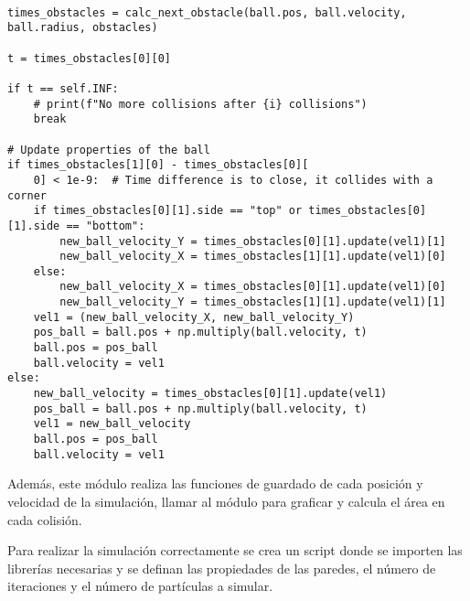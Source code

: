 \begin{lstlisting}[breaklines]

times_obstacles = calc_next_obstacle(ball.pos, ball.velocity, ball.radius, obstacles)

t = times_obstacles[0][0]

if t == self.INF:
    # print(f"No more collisions after {i} collisions")
    break

# Update properties of the ball
if times_obstacles[1][0] - times_obstacles[0][
    0] < 1e-9:  # Time difference is to close, it collides with a corner
    if times_obstacles[0][1].side == "top" or times_obstacles[0][1].side == "bottom":
        new_ball_velocity_Y = times_obstacles[0][1].update(vel1)[1]
        new_ball_velocity_X = times_obstacles[1][1].update(vel1)[0]
    else:
        new_ball_velocity_X = times_obstacles[0][1].update(vel1)[0]
        new_ball_velocity_Y = times_obstacles[1][1].update(vel1)[1]
    vel1 = (new_ball_velocity_X, new_ball_velocity_Y)
    pos_ball = ball.pos + np.multiply(ball.velocity, t)
    ball.pos = pos_ball
    ball.velocity = vel1
else:
    new_ball_velocity = times_obstacles[0][1].update(vel1)
    pos_ball = ball.pos + np.multiply(ball.velocity, t)
    vel1 = new_ball_velocity
    ball.pos = pos_ball
    ball.velocity = vel1
\end{lstlisting}

Además, este módulo realiza las funciones de guardado de cada posición y velocidad de la simulación, llamar al módulo para graficar y calcula el área en cada colisión.

\vspace{3mm}

Para realizar la simulación correctamente se crea un script donde se importen las librerías necesarias y se definan las propiedades de las paredes, el número de iteraciones y el número de partículas a simular.

